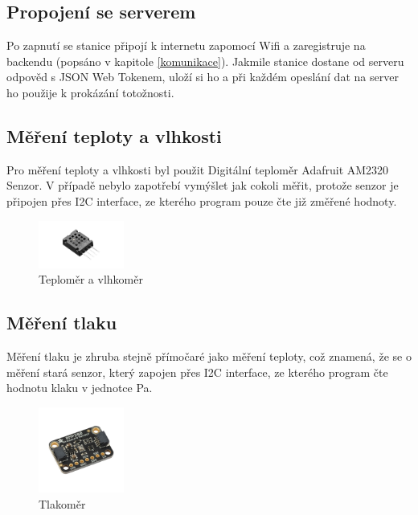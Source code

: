 \subsection{Propojení se serverem}
Po zapnutí se stanice připojí k internetu zapomocí Wifi a zaregistruje na backendu (popsáno v kapitole \ref{komunikace}). Jakmile stanice dostane od serveru odpověd s 
JSON Web Tokenem, uloží si ho a při každém opeslání dat na server ho použije k prokázání totožnosti.

\subsection{Měření teploty a vlhkosti}
Pro měření teploty a vlhkosti byl použit Digitální teploměr Adafruit AM2320 Senzor\cite{teplomer}. V případě nebylo zapotřebí vymýšlet jak cokoli měřit,
protože senzor je připojen přes I2C interface, ze kterého program pouze čte již změřené hodnoty.
\begin{figure}[h] 
    \centering
    \includegraphics[width=0.25\textwidth]{images/Adafruit-AM2320.jpg}
    \caption{Teploměr a vlhkoměr}
\end{figure}

\subsection{Měření tlaku}
Měření tlaku je zhruba stejně přímočaré jako měření teploty, což znamená, že se o měření stará senzor\cite{tlakoměr},
který zapojen přes I2C interface, ze kterého program čte hodnotu klaku v jednotce Pa.

\begin{figure}[h] 
    \centering
    \includegraphics[width=0.25\textwidth]{images/Adafruit-BMP280.jpg}
    \caption{Tlakoměr}
\end{figure}
